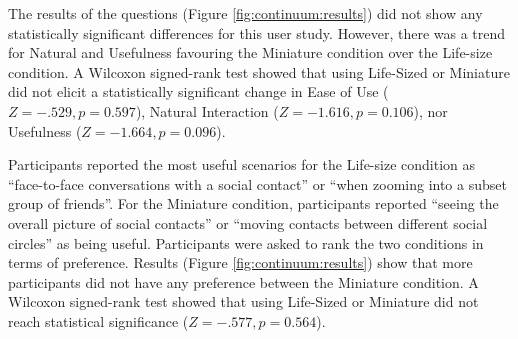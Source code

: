 The results of the questions (Figure \ref{fig:continuum:results}) did not show any statistically significant differences for this user study. However, there was a trend for Natural and Usefulness favouring the Miniature condition over the Life-size condition. A Wilcoxon signed-rank test showed that using Life-Sized or Miniature did not elicit a statistically significant change in Ease of Use ($Z=-.529, p=0.597$), Natural Interaction ($Z=-1.616, p=0.106$), nor Usefulness ($Z=-1.664, p=0.096$). 

Participants reported the most useful scenarios for the Life-size condition as \enquote{face-to-face conversations with a social contact} or \enquote{when zooming into a subset group of friends}. For the Miniature condition, participants reported \enquote{seeing the overall picture of social contacts} or \enquote{moving contacts between different social circles} as being useful. Participants were asked to rank the two conditions in terms of preference. Results (Figure \ref{fig:continuum:results}) show that more participants did not have any preference between the Miniature condition. A Wilcoxon signed-rank test showed that using Life-Sized or Miniature did not reach statistical significance ($Z=-.577, p=0.564$).

